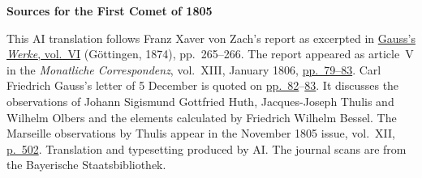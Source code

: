 \clearpage\thispagestyle{empty}
\begin{center}\textbf{Sources for the First Comet of 1805}\end{center}
\noindent This AI translation follows Franz Xaver von Zach’s report as excerpted in \href{https://gdz.sub.uni-goettingen.de/id/PPN236007467}{Gauss’s \textit{Werke}, vol.~VI} (Göttingen, 1874), pp.~265--266. The report appeared as article~V in the \textit{Monatliche Correspondenz}, vol.~XIII, January 1806, \href{https://www.digitale-sammlungen.de/en/view/bsb10538605?page=87}{pp.~79--83}. Carl Friedrich Gauss’s letter of 5 December is quoted on \href{https://www.digitale-sammlungen.de/en/view/bsb10538605?page=90}{pp.~82}--\href{https://www.digitale-sammlungen.de/en/view/bsb10538605?page=91}{83}. It discusses the observations of Johann Sigismund Gottfried Huth, Jacques-Joseph Thulis and Wilhelm Olbers and the elements calculated by Friedrich Wilhelm Bessel. The Marseille observations by Thulis appear in the November 1805 issue, vol.~XII, \href{https://www.digitale-sammlungen.de/en/view/bsb10538604?page=518}{p.~502}. Translation and typesetting produced by AI. The journal scans are from the Bayerische Staatsbibliothek.
\clearpage
